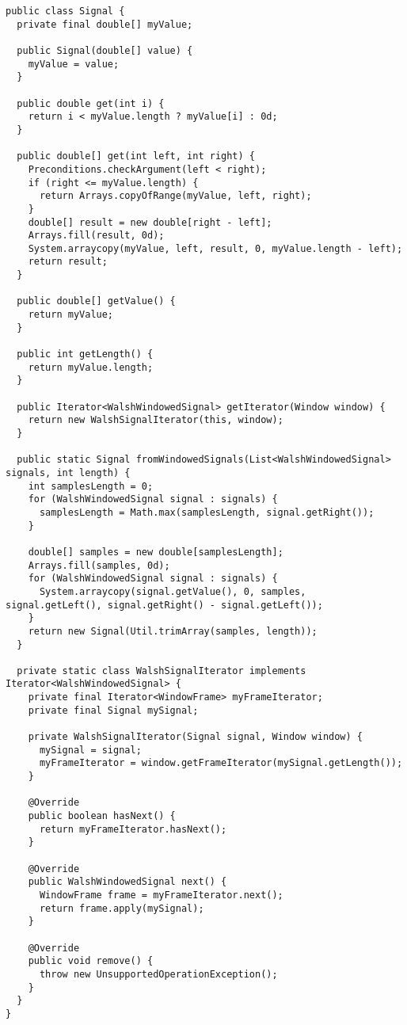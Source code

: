\begin{lstlisting}[caption={Исходный поток данных}]
public class Signal {
  private final double[] myValue;

  public Signal(double[] value) {
    myValue = value;
  }

  public double get(int i) {
    return i < myValue.length ? myValue[i] : 0d;
  }

  public double[] get(int left, int right) {
    Preconditions.checkArgument(left < right);
    if (right <= myValue.length) {
      return Arrays.copyOfRange(myValue, left, right);
    }
    double[] result = new double[right - left];
    Arrays.fill(result, 0d);
    System.arraycopy(myValue, left, result, 0, myValue.length - left);
    return result;
  }

  public double[] getValue() {
    return myValue;
  }

  public int getLength() {
    return myValue.length;
  }

  public Iterator<WalshWindowedSignal> getIterator(Window window) {
    return new WalshSignalIterator(this, window);
  }

  public static Signal fromWindowedSignals(List<WalshWindowedSignal> signals, int length) {
    int samplesLength = 0;
    for (WalshWindowedSignal signal : signals) {
      samplesLength = Math.max(samplesLength, signal.getRight());
    }

    double[] samples = new double[samplesLength];
    Arrays.fill(samples, 0d);
    for (WalshWindowedSignal signal : signals) {
      System.arraycopy(signal.getValue(), 0, samples, signal.getLeft(), signal.getRight() - signal.getLeft());
    }
    return new Signal(Util.trimArray(samples, length));
  }

  private static class WalshSignalIterator implements Iterator<WalshWindowedSignal> {
    private final Iterator<WindowFrame> myFrameIterator;
    private final Signal mySignal;

    private WalshSignalIterator(Signal signal, Window window) {
      mySignal = signal;
      myFrameIterator = window.getFrameIterator(mySignal.getLength());
    }

    @Override
    public boolean hasNext() {
      return myFrameIterator.hasNext();
    }

    @Override
    public WalshWindowedSignal next() {
      WindowFrame frame = myFrameIterator.next();
      return frame.apply(mySignal);
    }

    @Override
    public void remove() {
      throw new UnsupportedOperationException();
    }
  }
}
\end{lstlisting}